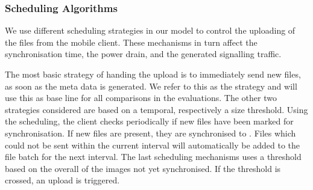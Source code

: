 \subsubsection*{Scheduling Algorithms}\label{sec:application:cloud_file_synchronisation:system_model:algorithms}
We use different scheduling strategies in our model to control the uploading of the files from the mobile client.
These mechanisms in turn affect the synchronisation time, the power drain, and the generated signalling traffic.

The most basic strategy of handing the upload is to immediately send new files, as soon as the meta data is generated.
We refer to this as the \algoimmediate strategy and will use this as base line for all comparisons in the evaluations.
The other two strategies considered are based on a temporal, respectively a size threshold. 
Using the \algointerval scheduling, the client checks periodically if new files have been marked for synchronisation.
If new files are present, they are synchronised to \dropbox.
Files which could not be sent within the current interval will automatically be added to the file batch for the next interval. 
The last scheduling mechanisms uses a threshold based on the overall \algosize of the images not yet synchronised.
If the threshold is crossed, an upload is triggered.
